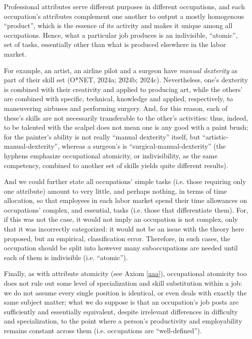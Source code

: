 \documentclass[hidelinks, nonatbib]{elsarticle}
\begin{document}
\begin{observation}
    \label{oao}
    Professional attributes serve different purposes in different occupations, and each occupation's attributes complement one another to output a mostly homogenous ``product'', which is the essence of its activity and makes it unique among all occupations. Hence, what a particular job produces is an indivisible, ``atomic'', set of tasks, essentially other than what is produced elsewhere in the labor market.
\end{observation}

For example, an artist, an airline pilot and a surgeon have \textit{manual dexterity} as part of their skill set (O*NET, 2024a; 2024b; 2024c). Nevertheless, one's dexterity is combined with their creativity and applied to producing art, while the others' are combined with specific, technical, knowledge and applied, respectively, to maneuvering airbuses and performing surgery. And, for this reason, each of these's skills are not necessarily transferable to the other's activities: thus, indeed, to be talented with the scalpel does not mean one is any good with a paint brush; for the painter's ability is not really ``manual dexterity'' itself, but ``artistic-manual-dexterity'', whereas a surgeon's is ``surgical-manual-dexterity'' (the hyphens emphasize occupational atomicity, or indivisibility, as the same competency, combined to another set of skills yields quite different results).

And we could further state all occupations' simple tasks (i.e. those requiring only one attribute) amount to very little, and perhaps nothing, in terms of time allocation, so that employees in each labor market spend their time allowances on occupations' complex, and essential, tasks (i.e. those that differentiate them). For, if this was not the case, it would not imply an occupation is not complex, only that it was incorrectly categorized: it would not be an issue with the theory here proposed, but an empirical, classification error. Therefore, in such cases, the occupation should be split into however many suboccupations are needed until each of them is indivisible (i.e. ``atomic'').

Finally, as with attribute atomicity (see Axiom \ref{aaa}), occupational atomicity too does not rule out some level of specialization and skill substitution within a job: we do not assume every single position is identical, or even deals with exactly the same subject matter; what we do suppose is that an occupation's job posts are sufficiently and essentially equivalent, despite irrelevant differences in difficulty and specialization, to the point where a person's productivity and employability remains constant across them (i.e. occupations are ``well-defined'').
\end{document}

